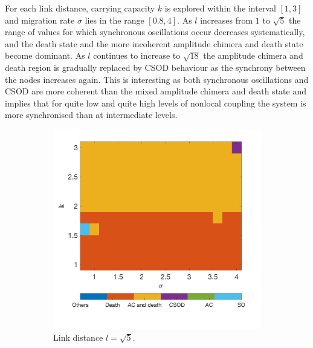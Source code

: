 \documentclass[12pt]{article}
\begin{document}
\noindent For each link distance, carrying capacity $k$ is explored within the interval $[1,3]$ and migration rate $\sigma$ lies in the range $[0.8,4]$. As $l$ increases from $1$ to $\sqrt{5}$ the range of values for which synchronous oscillations occur decreases systematically, and the death state and the more incoherent amplitude chimera and death state become dominant. As $l$ continues to increase to $\sqrt{18}$ the amplitude chimera and death region is gradually replaced by CSOD behaviour as the synchrony between the nodes increases again. This is interesting as both synchronous oscillations and CSOD are more coherent than the mixed amplitude chimera and death state and implies that for quite low and quite high levels of nonlocal coupling the system is more synchronised than at intermediate levels.

\begin{figure}[h]
    \centering
    \begin{subfigure}[b]{0.4\linewidth}
    \centering
    \includegraphics[width=\textwidth]{Xinzhu Section/2dlat16_sqrt(5).png}
    \caption{Link distance $l=\sqrt{5}$.}
    \end{subfigure}
    \hfill
    \begin{subfigure}[b]{0.4\linewidth}
    \centering

\end{subfigure}
\end{figure}
\end{document}
